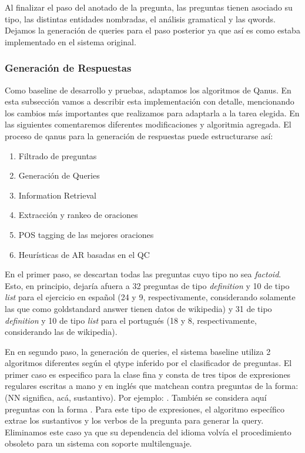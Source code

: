 Al finalizar el paso del anotado de la pregunta, las preguntas tienen asociado su tipo, las distintas entidades nombradas, el análisis gramatical y las qwords. Dejamos la generación de queries para el paso posterior ya que así es como estaba implementado en el sistema original.

\subsubsection{Generación de Respuestas}

Como baseline de desarrollo y pruebas, adaptamos los algoritmos de Qanus. En esta subsección vamos a describir esta implementación con detalle, mencionando los cambios más importantes que realizamos para adaptarla a la tarea elegida. En las siguientes comentaremos diferentes modificaciones y algoritmia agregada. El proceso de qanus para la generación de respuestas puede estructurarse así:
\begin{enumerate}
  \item Filtrado de preguntas
  \item Generación de Queries
  \item Information Retrieval
  \item Extracción y rankeo de oraciones
  \item POS tagging de las mejores oraciones
  \item Heurísticas de AR basadas en el QC
\end{enumerate}

En el primer paso, se descartan todas las preguntas cuyo tipo no sea \textit{factoid}. Esto, en principio, dejaría afuera a 32 preguntas de tipo \textit{definition} y 10 de tipo \textit{list} para el ejercicio en español (24 y 9, respectivamente, considerando solamente las que como goldstandard answer tienen datos de wikipedia) y 31 de tipo \textit{definition} y 10 de tipo \textit{list} para el portugués (18 y 8, respectivamente, considerando las de wikipedia).

En en segundo paso, la generación de queries, el sistema baseline utiliza 2 algoritmos diferentes según el qtype inferido por el clasificador de preguntas. El primer caso es especifico para la clase fina  y consta de tres tipos de expresiones regulares escritas a mano y en inglés que matchean contra preguntas de la forma:  (NN significa, acá, sustantivo). Por ejemplo: . También se considera aquí preguntas con la forma . Para este tipo de expresiones, el algoritmo específico extrae los sustantivos y los verbos de la pregunta para generar la query. Eliminamos este caso ya que su dependencia del idioma volvía el procedimiento obsoleto para un sistema con soporte multilenguaje.

